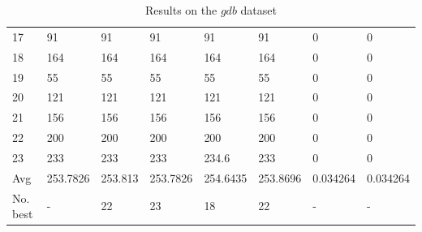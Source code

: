 \documentclass[conference]{IEEEtran}
\begin{document}
\begin{table}[h]
{\begin{tabular}{llllllll}
            17    & 91       & 91      & 91       & 91       & 91       & 0        & 0        \\
            18    & 164      & 164     & 164      & 164      & 164      & 0        & 0        \\
            19    & 55       & 55      & 55       & 55       & 55       & 0        & 0        \\
            20    & 121      & 121     & 121      & 121      & 121      & 0        & 0        \\
            21    & 156      & 156     & 156      & 156      & 156      & 0        & 0        \\
            22    & 200      & 200     & 200      & 200      & 200      & 0        & 0        \\
            23    & 233      & 233     & 233      & 234.6    & 233      & 0        & 0        \\
            Avg      & 253.7826 & 253.813 & 253.7826 & 254.6435 & 253.8696 & 0.034264 & 0.034264 \\
            No. best & -        & 22      & 23       & 18       & 22       & -        & -        \\
            \bottomrule
        \end{tabular}
    }
    \caption{Results on the $gdb$ dataset}
    \label{tab:gdb}
\end{table}
\end{document}

